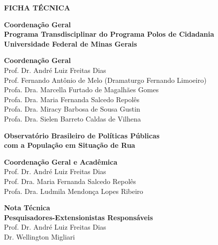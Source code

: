 \documentclass[14pt]{extarticle}
\begin{document}

\thispagestyle{empty}

\vspace{1cm}
\hfill\allowbreak
\begin{minipage}{\textwidth}
\vspace{2cm}
\noindent\textbf{FICHA TÉCNICA}\\
\vspace{1cm}

\noindent\textbf{Coordenação Geral\\ Programa Transdisciplinar do Programa Polos de Cidadania\\ Universidade Federal de Minas Gerais}\\
\vspace{0.2cm}

\noindent\textbf{Coordenação Geral}\\
Prof. Dr. André Luiz Freitas Dias\\
Prof. Fernando Antônio de Melo (Dramaturgo Fernando Limoeiro)\\
Profa. Dra. Marcella Furtado de Magalhães Gomes\\
Profa. Dra. Maria Fernanda Salcedo Repolês\\
Profa. Dra. Miracy Barbosa de Sousa Gustin\\
Profa. Dra. Sielen Barreto Caldas de Vilhena\\
\vspace{1cm}

\noindent\textbf{Observatório Brasileiro de Políticas Públicas\\ com a População em Situação de Rua}\\
\vspace{0.2cm}

\noindent\textbf{Coordenação Geral e Acadêmica}\\
Prof. Dr. André Luiz Freitas Dias\\
Prof. Dra. Maria Fernanda Salcedo Repolês\\
Profa. Dra. Ludmila Mendonça Lopes Ribeiro
\vspace{1cm}

\noindent\textbf{Nota Técnica}\\
\noindent\textbf{Pesquisadores-Extensionistas Responsáveis}\\
Prof. Dr. André Luiz Freitas Dias\\
Dr. Wellington Migliari\\
\end{minipage}
\end{document}
